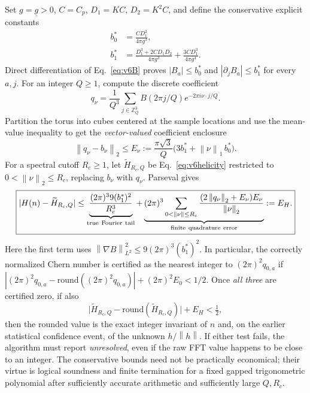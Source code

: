 \documentclass[aps,prd,onecolumn,notitlepage,11pt,superscriptaddress,longbibliography]{revtex4-2}
\newcommand{\norm}[1]{\left\lVert#1\right\rVert}
\begin{document}
Set $g=\underline g>0$, $C=C_p$, $D_1=KC$, $D_2=K^2C$, and define the conservative explicit constants
\begin{align}\label{eq:v6derivs}
b_0^*&=\frac{CD_1^2}{4\pi g^3},\\
b_1^*&=\frac{D_1^3+2CD_1D_2}{4\pi g^3}+\frac{3CD_1^3}{4\pi g^4}.
\end{align}
Direct differentiation of Eq.~\eqref{eq:v6B} proves $|B_a|\le b_0^*$ and $|\partial_jB_a|\le b_1^*$ for every $a,j$. For an integer $Q\ge1$, compute the discrete coefficient
\begin{equation}
q_\nu=\frac1{Q^3}\sum_{j\in\mathbb Z_Q^3}B(2\pi j/Q)e^{-2\pi i\nu\cdot j/Q}.
\end{equation}
Partition the torus into cubes centered at the sample locations and use the mean-value inequality to get the \emph{vector-valued} coefficient enclosure
\begin{equation}\label{eq:v6quadrature}
\boxed{\norm{q_\nu-b_\nu}_2\le E_\nu:=\frac{\pi\sqrt3}{Q}\bigl(3b_1^*+\norm\nu_1\,b_0^*\bigr).}
\end{equation}
For a spectral cutoff $R_c\ge1$, let $\widetilde H_{R_c,Q}$ be Eq.~\eqref{eq:v6helicity} restricted to $0<\norm\nu_2\le R_c$, replacing $b_\nu$ with $q_\nu$. Parseval gives
\begin{equation}\label{eq:v6tail}
\boxed{|H(n)-\widetilde H_{R_c,Q}|\le \underbrace{\frac{(2\pi)^3 9(b_1^*)^2}{R_c^3}}_{\rm true\ Fourier\ tail}+\underbrace{(2\pi)^3\sum_{0<\norm\nu\le R_c}\frac{(2\norm{q_\nu}_2+E_\nu)E_\nu}{\norm\nu_2}}_{\rm finite\ quadrature\ error}:=E_H.}
\end{equation}
Here the first term uses $\norm{\nabla B}_{L^2}^2\le9(2\pi)^3(b_1^*)^2$. In particular, the correctly normalized Chern number is certified as the nearest integer to $(2\pi)^2q_{0,a}$ if $|(2\pi)^2q_{0,a}-\mathrm{round}((2\pi)^2q_{0,a})|+(2\pi)^2E_0<1/2$. Once \emph{all three} are certified zero, if also
\begin{equation}\label{eq:v6round}
\boxed{\bigl|\widetilde H_{R_c,Q}-\mathrm{round}(\widetilde H_{R_c,Q})\bigr|+E_H<\tfrac12,}
\end{equation}
then the rounded value is the exact integer invariant of $n$ and, on the earlier statistical confidence event, of the unknown $h/\norm h$. If either test fails, the algorithm must report \emph{unresolved}, even if the raw FFT value happens to be close to an integer. The conservative bounds need not be practically economical; their virtue is logical soundness and finite termination for a fixed gapped trigonometric polynomial after sufficiently accurate arithmetic and sufficiently large $Q,R_c$.
\end{document}
